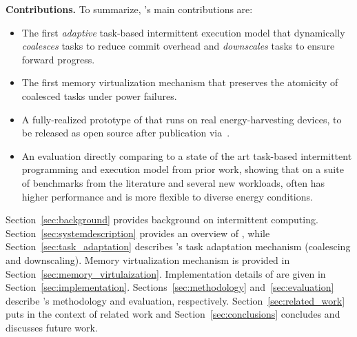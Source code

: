 %
%
%

\textbf{Contributions.} To summarize, \sys's main contributions are:
%
\begin{itemize}
\item The first {\em adaptive} task-based intermittent execution model that
dynamically \emph{coalesces} tasks to reduce commit overhead and
\emph{downscales} tasks to ensure forward progress.
\item The first memory virtualization mechanism that preserves the atomicity of coalesced tasks under power failures.
\item A fully-realized prototype of \sys that runs on real energy-harvesting devices, to be released as open source after publication via~\cite{coala_website}.
\item An evaluation directly comparing \sys to a state of the art task-based
intermittent programming and execution model from prior work, showing that on a
suite of benchmarks from the literature and several new workloads, \sys often
has higher performance and is more flexible to diverse energy conditions.
\end{itemize}
%
Section~\ref{sec:background} provides background on intermittent computing.
Section~\ref{sec:systemdescription} provides an overview of \sys, while
Section~\ref{sec:task_adaptation} describes \sys's task adaptation mechanism (coalescing and downscaling). Memory virtualization mechanism is provided in Section~\ref{sec:memory_virtulaization}. Implementation details of \sys are given in Section~\ref{sec:implementation}. Sections~\ref{sec:methodology} and~\ref{sec:evaluation} describe \sys's methodology and evaluation, respectively. Section~\ref{sec:related_work} puts \sys in the
context of related work and Section~\ref{sec:conclusions} concludes and discusses
future work.

